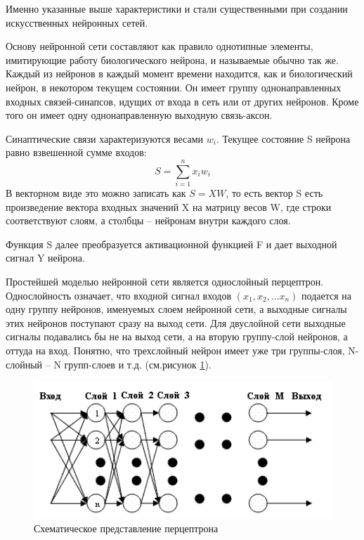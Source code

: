 \documentclass[a4paper,14pt,russian,utf8,nocolumnsxix,nocolumnxxxi,nocolumnxxxii]{eskdtext}
\begin{document}
Именно указанные выше характеристики и стали существенными при создании искусственных нейронных сетей.

Основу нейронной сети составляют как правило однотипные элементы, имитирующие работу биологического нейрона, и называемые обычно так же. Каждый из нейронов в каждый момент времени находится, как и биологический нейрон, в некотором текущем состоянии. Он имеет группу однонаправленных входных связей-синапсов, идущих от входа в сеть или от других нейронов. Кроме того он имеет одну однонаправленную выходную связь-аксон.
\pagebreak

Синаптические связи характеризуются весами $w_i$. Текущее состояние S нейрона равно взвешенной сумме входов:
\begin{equation}
S=\sum_{i=1}^{n}x_i w_i
\end{equation}
В векторном виде это можно записать как $S=XW$, то есть вектор S есть произведение вектора входных значений X на матрицу весов W, где строки соответствуют слоям, а столбцы – нейронам внутри каждого слоя.

Функция S далее преобразуется активационной функцией F и дает выходной сигнал Y нейрона.

Простейшей моделью нейронной сети является однослойный перцептрон. Однослойность означает, что входной сигнал входов $(x_1,x_2,… x_n)$ подается на одну группу нейронов, именуемых слоем нейронной сети, а выходные сигналы этих нейронов поступают сразу на выход сети. Для двуслойной сети выходные сигналы подавались бы не на выход сети, а на вторую группу-слой нейронов, а оттуда на вход. Понятно, что трехслойный нейрон имеет уже три группы-слоя, N-слойный – N групп-слоев и т.д. (см.рисунок \ref{percept}).

\begin{figure}[h!]
	\centering
	\includegraphics[width=120mm]{percept.png}
	\caption{Схематическое представление перцептрона}
	\label{percept}
\end{figure}
\end{document}
